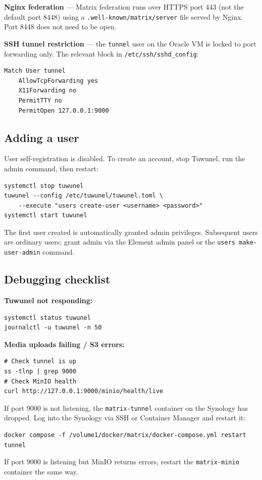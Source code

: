 \documentclass[11pt]{article}
\begin{document}
\textbf{Nginx federation} --- Matrix federation runs over HTTPS port 443 (not
the default port 8448) using a \texttt{.well-known/matrix/server} file served
by Nginx.  Port 8448 does not need to be open.

\textbf{SSH tunnel restriction} --- the \texttt{tunnel} user on the Oracle VM
is locked to port forwarding only.  The relevant block in
\texttt{/etc/ssh/sshd\_config}:

\begin{verbatim}
Match User tunnel
    AllowTcpForwarding yes
    X11Forwarding no
    PermitTTY no
    PermitOpen 127.0.0.1:9000
\end{verbatim}

\subsection*{Adding a user}

User self-registration is disabled.  To create an account, stop Tuwunel, run
the admin command, then restart:

\begin{verbatim}
systemctl stop tuwunel
tuwunel --config /etc/tuwunel/tuwunel.toml \
    --execute "users create-user <username> <password>"
systemctl start tuwunel
\end{verbatim}

The first user created is automatically granted admin privileges.  Subsequent
users are ordinary users; grant admin via the Element admin panel or the
\texttt{users make-user-admin} command.

\subsection*{Debugging checklist}

\textbf{Tuwunel not responding:}
\begin{verbatim}
systemctl status tuwunel
journalctl -u tuwunel -n 50
\end{verbatim}

\textbf{Media uploads failing / S3 errors:}
\begin{verbatim}
# Check tunnel is up
ss -tlnp | grep 9000
# Check MinIO health
curl http://127.0.0.1:9000/minio/health/live
\end{verbatim}
If port 9000 is not listening, the \texttt{matrix-tunnel} container on the
Synology has dropped.  Log into the Synology via SSH or Container Manager and
restart it:
\begin{verbatim}
docker compose -f /volume1/docker/matrix/docker-compose.yml restart tunnel
\end{verbatim}
If port 9000 is listening but MinIO returns errors, restart the
\texttt{matrix-minio} container the same way.
\end{document}
